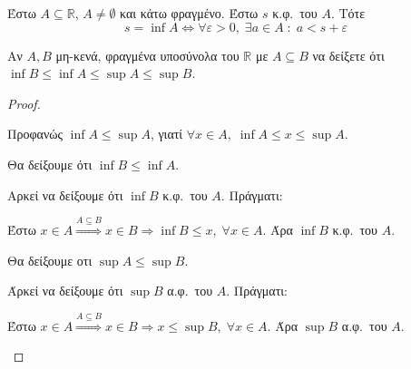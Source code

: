 \begin{mybox3}
\begin{prop}
  Έστω $ A \subseteq \mathbb{R} $, $ A \neq \emptyset $ και κάτω  φραγμένο. 
  Έστω $ s $ κ.φ.\ του $A$. Τότε 
  \[
    s= \inf A \Leftrightarrow \forall \varepsilon >0, \; \exists a \in A \; 
    : \; a < s + \varepsilon  
  \]
\end{prop}
\end{mybox3}

\begin{mybox3}
\begin{prop}
  Αν $ A, B $ μη-κενά, φραγμένα υποσύνολα του 
  $ \mathbb{R} $ με $ A \subseteq B $ να δείξετε ότι 
  $ \inf B \leq \inf A \leq \sup A \leq \sup B $.
\end{prop}
\end{mybox3}
\begin{proof}
\item {} 
  \begin{myitemize}
    \item Προφανώς $ \inf A \leq \sup A $, γιατί $ \forall x \in A, \; 
      \inf A \leq x \leq \sup A $.
    \item Θα δείξουμε ότι $ \inf B \leq \inf A $. 

      Αρκεί να δείξουμε ότι $ \inf B $ κ.φ.\ του $A$. Πράγματι:

      Έστω $ x \in A \overset{A \subseteq B}{\Rightarrow} x \in B \Rightarrow 
      \inf B \leq x, \; \forall x \in A $. Άρα $ \inf B $ κ.φ.\ του $A$.
    \item Θα δείξουμε οτι $ \sup A \leq \sup B $. 

      Άρκεί να δείξουμε ότι $ \sup B $ α.φ.\ του $A$. Πράγματι:

      Έστω $ x \in A \overset{A \subseteq B}{\Rightarrow} x \in B \Rightarrow 
      x \leq \sup B, \; \forall x \in A $.  Άρα $ \sup B $ α.φ.\ του $A$.
  \end{myitemize}
\end{proof}

